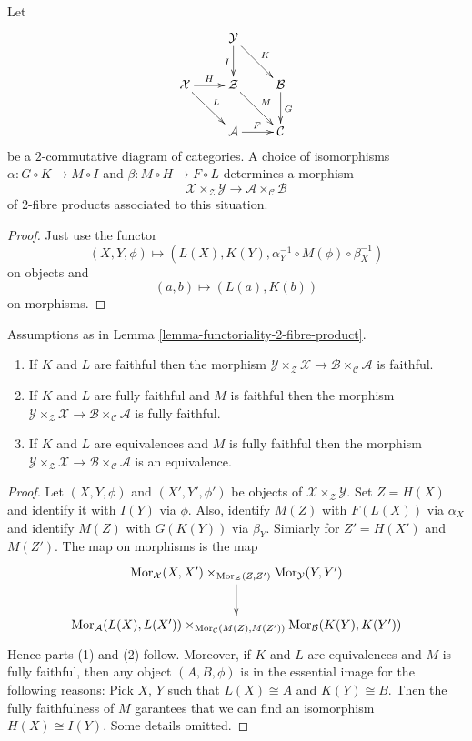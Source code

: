 \begin{lemma}
\label{lemma-functoriality-2-fibre-product}
Let
$$
\xymatrix{
& \mathcal{Y} \ar[d]_I \ar[rd]^K & \\
\mathcal{X} \ar[r]^H \ar[rd]^L &
\mathcal{Z} \ar[rd]^M & \mathcal{B} \ar[d]^G \\
& \mathcal{A} \ar[r]^F & \mathcal{C}
}
$$
be a $2$-commutative diagram of categories.
A choice of isomorphisms
$\alpha : G \circ K \to M \circ I$ and
$\beta : M \circ H \to F \circ L$
determines a morphism
$$
\mathcal{X} \times_{\mathcal{Z}} \mathcal{Y}
\longrightarrow
\mathcal{A} \times_{\mathcal{C}} \mathcal{B}
$$
of $2$-fibre products associated to this situation.
\end{lemma}

\begin{proof}
Just use the functor
$$
(X, Y, \phi) \longmapsto (L(X), K(Y),
\alpha^{-1}_Y \circ M(\phi) \circ \beta^{-1}_X)
$$
on objects and
$$
(a, b) \longmapsto (L(a), K(b))
$$
on morphisms.
\end{proof}

\begin{lemma}
\label{lemma-equivalence-2-fibre-product}
Assumptions as in Lemma \ref{lemma-functoriality-2-fibre-product}.
\begin{enumerate}
\item If $K$ and $L$ are faithful
then the morphism
$\mathcal{Y} \times_{\mathcal{Z}} \mathcal{X} \to
\mathcal{B} \times_{\mathcal{C}} \mathcal{A}$
is faithful.
\item If $K$ and $L$ are fully faithful and $M$ is faithful
then the morphism
$\mathcal{Y} \times_{\mathcal{Z}} \mathcal{X} \to
\mathcal{B} \times_{\mathcal{C}} \mathcal{A}$
is fully faithful.
\item If $K$ and $L$ are equivalences and $M$ is fully faithful
then the morphism
$\mathcal{Y} \times_{\mathcal{Z}} \mathcal{X} \to
\mathcal{B} \times_{\mathcal{C}} \mathcal{A}$
is an equivalence.
\end{enumerate}
\end{lemma}

\begin{proof}
Let $(X, Y, \phi)$ and $(X', Y', \phi')$ be objects of
$\mathcal{X} \times_{\mathcal{Z}} \mathcal{Y}$.
Set $Z = H(X)$ and identify it with $I(Y)$ via $\phi$.
Also, identify $M(Z)$ with $F(L(X))$ via $\alpha_X$ and
identify $M(Z)$ with $G(K(Y))$ via $\beta_Y$. Simiarly for
$Z' = H(X')$ and $M(Z')$.
The map on morphisms is the map
$$
\xymatrix{
\text{Mor}_{\mathcal{X}}(X, X')
\times_{\text{Mor}_{\mathcal{Z}}(Z, Z')}
\text{Mor}_{\mathcal{Y}}(Y, Y')
\ar[d] \\
\text{Mor}_{\mathcal{A}}(L(X), L(X'))
\times_{\text{Mor}_{\mathcal{C}}(M(Z), M(Z'))}
\text{Mor}_{\mathcal{B}}(K(Y), K(Y'))
}
$$
Hence parts (1) and (2) follow. Moreover, if $K$ and $L$
are equivalences and $M$ is fully faithful, then any object
$(A, B, \phi)$ is in the essential image for the following reasons:
Pick $X$, $Y$ such that $L(X) \cong A$ and $K(Y) \cong B$.
Then the fully faithfulness of $M$ garantees that we can
find an isomorphism $H(X) \cong I(Y)$. Some details omitted.
\end{proof}

